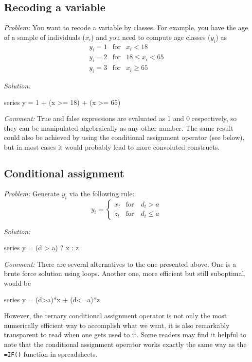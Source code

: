 \subsection{Recoding a variable}

\emph{Problem:} You want to recode a variable by classes. For example,
you have the age of a sample of individuals ($x_i$) and you need to
compute age classes ($y_i$) as
\begin{eqnarray*}
  y_i = 1 & \mathrm{for} & x_i < 18 \\
  y_i = 2 & \mathrm{for} & 18 \le x_i < 65 \\
  y_i = 3 & \mathrm{for} & x_i \ge 65
\end{eqnarray*}

\emph{Solution:}
\begin{code}
series y = 1 + (x >= 18) + (x >= 65)
\end{code}

\emph{Comment:} True and false expressions are evaluated as 1 and 0
respectively, so they can be manipulated algebraically as any other
number. The same result could also be achieved by using the
conditional assignment operator (see below), but in most cases it
would probably lead to more convoluted constructs.

\subsection{Conditional assignment}

\emph{Problem:} Generate $y_t$ via the following rule:
\[
  y_t = \left\{ 
    \begin{array}{ll} 
      x_t & \mathrm{for} \quad d_t > a \\ 
      z_t & \mathrm{for} \quad d_t \le a 
    \end{array}
    \right. 
\]

\emph{Solution:}
\begin{code}
series y = (d > a) ? x : z
\end{code}

\emph{Comment:} There are several alternatives to the one presented
above. One is a brute force solution using loops. Another one, more
efficient but still suboptimal, would be 
\begin{code}
series y = (d>a)*x + (d<=a)*z  
\end{code}
However, the ternary conditional assignment operator is not only the
most numerically efficient way to accomplish what we want, it is also
remarkably transparent to read when one gets used to it. Some readers
may find it helpful to note that the conditional assignment operator
works exactly the same way as the \texttt{=IF()} function in
spreadsheets.

